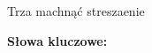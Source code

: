 \newpage

\begin{center}
\large \bf
\thetitle
\end{center}

Trza machnąć streszaenie

\bigskip
{\noindent\bf Słowa kluczowe:} \keywords

\vfill
